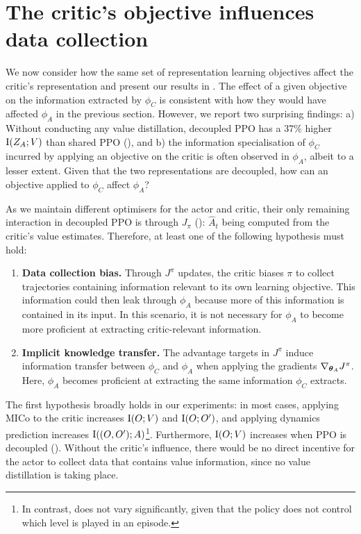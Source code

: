 \section{The critic's objective influences data collection}
%
We now consider how the same set of representation learning objectives affect the critic's representation and present our results in . The effect of a given objective on the information extracted by $\phi_C$ is consistent with how they would have affected $\phi_A$ in the previous section. However, we report two surprising findings: a) Without conducting any value distillation, decoupled PPO has a 37\% higher $\text{I}(Z_A;V)$ than shared PPO (), and b) the information specialisation of $\phi_C$ incurred by applying an objective on the critic is often observed in $\phi_A$, albeit to a lesser extent. Given that the two representations are decoupled, how can an objective applied to $\phi_C$ affect $\phi_A$?

As we maintain different optimisers for the actor and critic, their only remaining interaction in decoupled PPO is through $J_\pi$ (): $\hat{A}_t$ being computed from the critic's value estimates. Therefore, at least one of the following hypothesis must hold:
\begin{enumerate}[leftmargin=*]
\item \textbf{Data collection bias.} Through $J^\pi$ updates, the critic biases $\pi$ to collect trajectories containing information relevant to its own learning objective. This information could then leak through $\phi_A$ because more of this information is contained in its input. In this scenario, it is not necessary for $\phi_A$ to become more proficient at extracting critic-relevant information. 

\item \textbf{Implicit knowledge transfer.} The advantage targets in $J^\pi$ induce information transfer between $\phi_C$ and $\phi_A$ when applying the gradients $\nabla_{{\bm{\theta}}_A}J^\pi$. Here, $\phi_A$ becomes proficient at extracting the same information $\phi_C$ extracts.
\end{enumerate}

The first hypothesis broadly holds in our experiments: in most cases, applying MICo to the critic increases $\text{I}(O;V)$ and $\text{I}(O;O')$, and applying dynamics prediction increases $\text{I}((O,O');A)$\footnote{In contrast,  does not vary significantly, given that the policy does not control which level is played in an episode.}. Furthermore, $\text{I}(O;V)$ increases when PPO is decoupled (). Without the critic's influence, there would be no direct incentive for the actor to collect data that contains value information, since no value distillation is taking place. 

